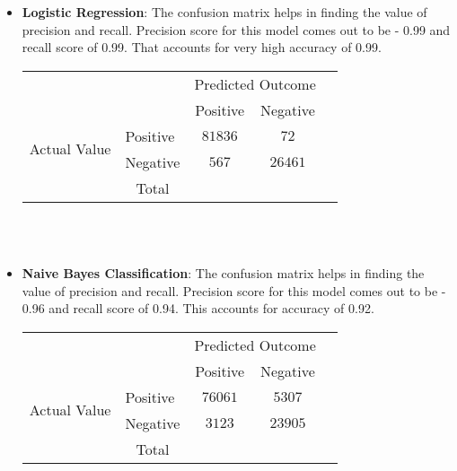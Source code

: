 \documentclass{article}
\begin{document}
\begin{itemize}
    \item \textbf{Logistic Regression}: The confusion matrix helps in finding the value of precision and recall. Precision score for this model comes out to be - 0.99 and recall score of 0.99. That accounts for very high accuracy of 0.99.  

\begin{center}
\begin{tabular}{l|l|c|c|c}
\multicolumn{2}{c}{}&\multicolumn{2}{c}{Predicted Outcome}&\\
\cline{3-4}
\multicolumn{2}{c|}{}&Positive&Negative&\multicolumn{1}{c}{}\\
\cline{2-4}
\multirow{2}{*}{Actual Value}& Positive & $81836$ & $72$\\
\cline{2-4}
& Negative & $567$ & $26461$\\
\cline{2-4}
\multicolumn{1}{c}{} & \multicolumn{1}{c}{Total} & \multicolumn{1}{c}{} & \multicolumn{    1}{c}{} & \multicolumn{1}{c}{}\\
\end{tabular} \\ \\
\end{center}
\item \textbf{Naive Bayes Classification}: The confusion matrix helps in finding the value of precision and recall. Precision score for this model comes out to be - 0.96 and recall score of 0.94. This accounts for accuracy of 0.92.  
\begin{center}
\begin{tabular}{l|l|c|c|c}
\multicolumn{2}{c}{}&\multicolumn{2}{c}{Predicted Outcome}&\\
\cline{3-4}
\multicolumn{2}{c|}{}&Positive&Negative&\multicolumn{1}{c}{}\\
\cline{2-4}
\multirow{2}{*}{Actual Value}& Positive & $76061$ & $5307$\\
\cline{2-4}
& Negative & $3123$ & $23905$\\
\cline{2-4}
\multicolumn{1}{c}{} & \multicolumn{1}{c}{Total} & \multicolumn{1}{c}{} & \multicolumn{    1}{c}{} & \multicolumn{1}{c}{}\\
\end{tabular} \\ \\
\end{center}


\end{itemize}
\end{document}
